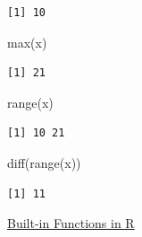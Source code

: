 \documentclass[
  letterpaper,
  DIV=11,
  numbers=noendperiod]{scrreprt}
\newenvironment{Shaded}{\begin{snugshade}}{\end{snugshade}}
\newcommand{\FunctionTok}[1]{\textcolor[rgb]{0.28,0.35,0.67}{#1}}
\newcommand{\NormalTok}[1]{\textcolor[rgb]{0.00,0.23,0.31}{#1}}
\begin{document}
\begin{verbatim}
[1] 10
\end{verbatim}

\begin{Shaded}
\begin{Highlighting}[]
\FunctionTok{max}\NormalTok{(x)}
\end{Highlighting}
\end{Shaded}

\begin{verbatim}
[1] 21
\end{verbatim}

\begin{Shaded}
\begin{Highlighting}[]
\FunctionTok{range}\NormalTok{(x)}
\end{Highlighting}
\end{Shaded}

\begin{verbatim}
[1] 10 21
\end{verbatim}

\begin{Shaded}
\begin{Highlighting}[]
\FunctionTok{diff}\NormalTok{(}\FunctionTok{range}\NormalTok{(x))}
\end{Highlighting}
\end{Shaded}

\begin{verbatim}
[1] 11
\end{verbatim}

\begin{watch}{}{}
    \href{https://youtu.be/pwgSeoNjwPo}{Built-in Functions in R}
\end{watch}
\end{document}
